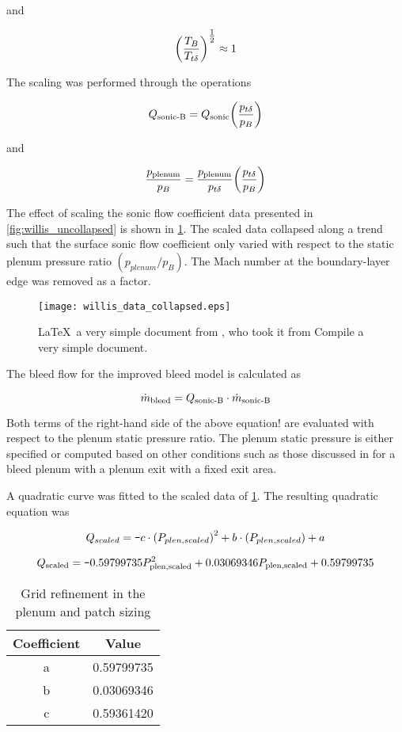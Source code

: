 and 

$$ \qty(\frac{T_B}{T_{t\delta}})^{\textstyle\frac{1}{2}} \approx 1 $$

The scaling was performed through the operations

$$ Q_{\textrm{sonic-B}} = Q_{\textrm{sonic}}\qty(\frac{p_{t\delta}}{p_B}) $$

and

$$ \frac{p_{\textrm{plenum}}}{p_B} = \frac{p_{\textrm{plenum}}}{p_{t\delta}}\qty(\frac{p_{t\delta}}{p_B}) $$

The effect of scaling the sonic flow coefficient data presented in \cref{fig:willis_uncollapsed} is shown in \cref{fig:willis_collapsed}. The scaled data collapsed along a trend such that the surface sonic flow coefficient only varied with respect to the static plenum pressure ratio $(p_{plenum}/p_B)$. The Mach number at the boundary-layer edge was removed as a factor.

\begin{figure}[htbp]
 \begin{center}
    \texttt{[image: willis\_data\_collapsed.eps]}
     \caption{\LaTeX\ a very simple document from \cite{Slater2012}, who took it from \cite{Willis1995} Compile a very simple document.}
     \label{fig:willis_collapsed}
 \end{center}
\end{figure}

The bleed flow for the improved bleed model is calculated as 

$$ \dot{m}_{\textrm{bleed}} = Q_{\textrm{sonic-B}} \cdot \dot{m}_{\textrm{sonic-B}} $$

Both terms of the right-hand side of the above equation! are evaluated with respect to the plenum static pressure ratio. The plenum static pressure is either specified or computed based on other conditions such as those discussed in \cite{Slater2010} for a bleed plenum with a plenum exit with a fixed exit area.

A quadratic curve was fitted to the scaled data of \cref{fig:willis_collapsed}. The resulting quadratic equation was


$$ Q_{scaled} = \texttt{-} c \cdot \qty(P_{plen, scaled})^2 + b\cdot \qty(P_{plen, scaled}) + a$$

$$ Q_{\textrm{scaled}} = \texttt{-}0.59799735P_{\textrm{plen,scaled}}^2 + 0.03069346P_{\textrm{plen,scaled}} + 0.59799735 $$

\begin{table}[!htbp] \centering 
\begin{tabular}[c]{*{2}{c}} \hline
\textbf{Coefficient} & \textbf{Value}   \\ \hline
a   & 0.59799735  \\ 
b   & 0.03069346  \\ 
c   & 0.59361420  \\ \hline
\end{tabular} 
\caption{Grid refinement in the plenum and patch sizing} 
\label{tab:slater} \end{table}

